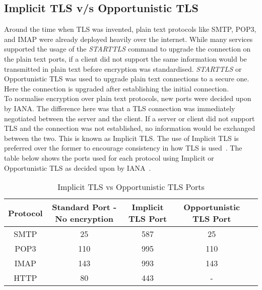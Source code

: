 \subsection{Implicit TLS v/s Opportunistic TLS}
Around the time when TLS was invented, plain text protocols like SMTP, POP3, and IMAP were already deployed heavily over the internet.
While many services supported the usage of the \textit{STARTTLS} command to upgrade the connection on the plain text ports, if a client 
did not support the same information would be transmitted in plain text before encryption was standardised. \textit{STARTTLS} or Opportunistic TLS was used 
to upgrade plain text connections to a secure one. Here the connection is upgraded after establishing the initial connection.\\
To normalise encryption over plain text protocols, new ports were decided upon by IANA. The difference here was that a TLS connection was immediately negotiated between 
the server and the client. If a server or client did not support TLS and the connection was not established, no information would be exchanged between 
the two. This is known as Implicit TLS. The use of Implicit TLS is preferred over the former to encourage consistency in 
how TLS is used~\cite{rfc8314}. The table below shows the ports used for each protocol using Implicit or Opportunistic TLS as decided upon 
by IANA~\cite{rfc6335}.
\begin{table}[h!]
    \centering
    \begin{tabular}{|c|c|c|c|c|}
        \hline
        Protocol &  Standard Port - No encryption & Implicit TLS Port & Opportunistic TLS Port\\
        \hline
        SMTP  &   25    &   587 &   25\\ 
        \hline
        POP3  &   110   &   995 &   110\\
        \hline
        IMAP &   143    &   993 &   143\\  
        \hline
        HTTP    &   80  &   443 &   -\\
        \hline
    \end{tabular}
    \caption{Implicit TLS vs Opportunistic TLS Ports}
    \label{tab:TLSports}
\end{table}

